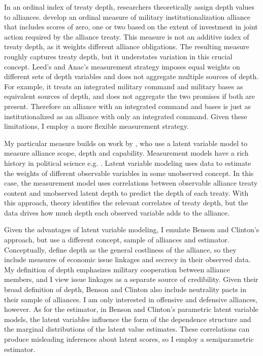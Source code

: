 \documentclass[12pt]{article}
\begin{document}
In an ordinal index of treaty depth, researchers theoretically assign depth values to alliances. 
\citep{LeedsAnac2005} develop an ordinal measure of military institutionalization alliance that includes scores of zero, one or two based on the extent of investment in joint action required by the alliance treaty. 
This measure is not an additive index of treaty depth, as it weights different alliance obligations.  
The resulting measure roughly captures treaty depth, but it understates variation in this crucial concept. 
Leed's and Anac's measurement strategy imposes equal weights on different sets of depth variables and does not aggregate multiple sources of depth. 
For example, it treats an integrated military command and military bases as equivalent sources of depth, and does not aggregate the two promises if both are present. 
Therefore an alliance with an integrated command and bases is just as institutionalized as an alliance with only an integrated command. 
Given these limitations, I employ a more flexible measurement strategy.


My particular measure builds on work by \citet{BensonClinton2016}, who use a latent variable model \citep{Quinn2004} to measure alliance scope, depth and capability.  
Measurement models have a rich history in political science e.g. \citep{Clintonetal2004, Fariss2014}.
Latent variable modeling uses data to estimate the weights of different observable variables in some unobserved concept. 
In this case, the measurement model uses correlations between observable alliance treaty content and unobserved latent depth to predict the depth of each treaty. 
With this approach, theory identifies the relevant correlates of treaty depth, but the data drives how much depth each observed variable adds to the alliance.


Given the advantages of latent variable modeling, I emulate Benson and Clinton's approach, but use a different concept, sample of alliances and estimator. 
Conceptually, \citet{BensonClinton2016} define depth as the general costliness of the alliance, so they include measures of economic issue linkages and secrecy in their observed data.
My definition of depth emphasizes military cooperation between alliance members, and I view issue linkages as a separate source of credibility. 
Given their broad definition of depth, Benson and Clinton also include neutrality pacts in their sample of alliances.
I am only interested in offensive and defensive alliances, however.  
As for the estimator, in Benson and Clinton's parametric latent variable models, the latent variables influence the form of the dependence structure and the marginal distributions of the latent value estimates. 
These correlations can produce misleading inferences about latent scores, so I employ a semiparametric estimator.
 
\end{document}
